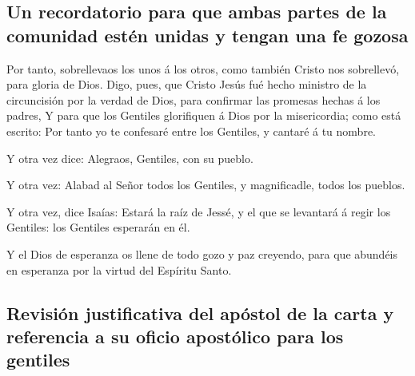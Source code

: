 \hypertarget{un-recordatorio-para-que-ambas-partes-de-la-comunidad-estuxe9n-unidas-y-tengan-una-fe-gozosa}{%
\subsection{Un recordatorio para que ambas partes de la comunidad estén
unidas y tengan una fe
gozosa}\label{un-recordatorio-para-que-ambas-partes-de-la-comunidad-estuxe9n-unidas-y-tengan-una-fe-gozosa}}

 Por tanto, sobrellevaos los unos á los otros, como
también Cristo nos sobrellevó, para gloria de Dios.  Digo,
pues, que Cristo Jesús fué hecho ministro de la circuncisión por la
verdad de Dios, para confirmar las promesas hechas á los padres,
 Y para que los Gentiles glorifiquen á Dios por la
misericordia; como está escrito: Por tanto yo te confesaré entre los
Gentiles, y cantaré á tu nombre.

 Y otra vez dice: Alegraos, Gentiles, con su pueblo.

 Y otra vez: Alabad al Señor todos los Gentiles, y
magnificadle, todos los pueblos.

 Y otra vez, dice Isaías: Estará la raíz de Jessé, y el
que se levantará á regir los Gentiles: los Gentiles esperarán en él.

 Y el Dios de esperanza os llene de todo gozo y paz
creyendo, para que abundéis en esperanza por la virtud del Espíritu
Santo.

\hypertarget{revisiuxf3n-justificativa-del-apuxf3stol-de-la-carta-y-referencia-a-su-oficio-apostuxf3lico-para-los-gentiles}{%
\subsection{Revisión justificativa del apóstol de la carta y referencia
a su oficio apostólico para los
gentiles}\label{revisiuxf3n-justificativa-del-apuxf3stol-de-la-carta-y-referencia-a-su-oficio-apostuxf3lico-para-los-gentiles}}

